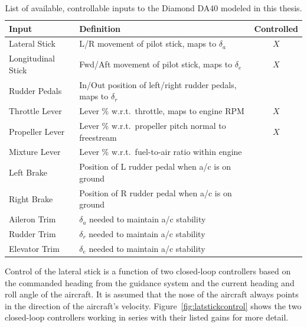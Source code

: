 \begin{table}[!ht]
    \caption{List of available, controllable inputs to the Diamond DA40 modeled in this thesis.}\label{tbl:controls}
    \centering
    \begin{tabular}{llc}
        \toprule
        \textbf{Input}     & \textbf{Definition}                                               & \textbf{Controlled} \\
        \midrule
        Lateral Stick      & L/R movement of pilot stick, maps to \(\delta_a\)                 & \(X\)               \\
        Longitudinal Stick & Fwd/Aft movement of pilot stick, maps to \(\delta_e\)             & \(X\)               \\
        Rudder Pedals      & In/Out position of left/right rudder pedals, maps to \(\delta_r\) &                     \\
        Throttle Lever     & Lever \% w.r.t.\ throttle, maps to engine RPM                     & \(X\)               \\
        Propeller Lever    & Lever \% w.r.t.\ propeller pitch normal to freestream             & \(X\)               \\
        Mixture Lever      & Lever \% w.r.t.\ fuel-to-air ratio within engine                  &                     \\
        Left Brake         & Position of L rudder pedal when a/c is on ground                  &                     \\
        Right Brake        & Position of R rudder pedal when a/c is on ground                  &                     \\
        Aileron Trim       & \(\delta_a\) needed to maintain a/c stability                     &                     \\
        Rudder Trim        & \(\delta_r\) needed to maintain a/c stability                     &                     \\
        Elevator Trim      & \(\delta_e\) needed to maintain a/c stability                     &                     \\
        \bottomrule
    \end{tabular}
\end{table}

Control of the lateral stick is a function of two closed-loop controllers based on the commanded heading from the guidance system and the current heading and roll angle of the aircraft. It is assumed that the nose of the aircraft always points in the direction of the aircraft's velocity. Figure~\ref{fig:latstickcontrol} shows the two closed-loop controllers working in series with their listed gains for more detail.

